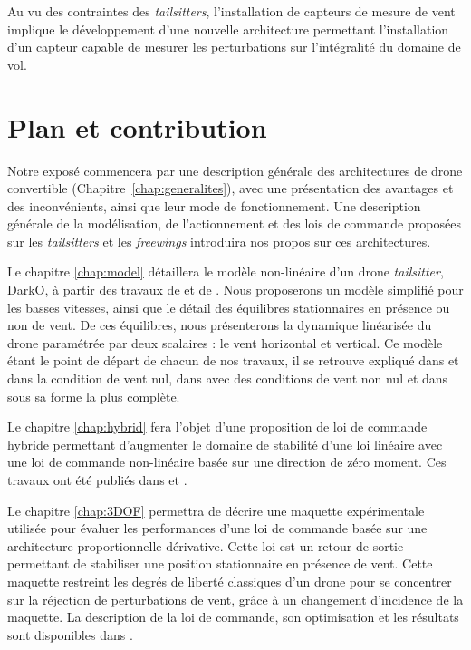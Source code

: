 Au vu des contraintes des \textit{tailsitters}, l'installation de capteurs de mesure de vent implique le développement d'une nouvelle architecture permettant l'installation d'un capteur capable de mesurer les perturbations sur l'intégralité du domaine de vol.


\section*{Plan et contribution}
Notre exposé commencera par une description générale des architectures de drone convertible (Chapitre~\ref{chap:generalites}), avec une présentation des avantages et des inconvénients, ainsi que leur mode de fonctionnement. Une description générale de la modélisation, de l'actionnement et des lois de commande proposées sur les \textit{tailsitters} et les \textit{freewings} introduira nos propos sur ces architectures.

Le chapitre \ref{chap:model} détaillera le modèle non-linéaire d'un drone \textit{tailsitter}, DarkO, à partir des travaux de \cite{lustosaHal-03035938} et de \cite{olszaneckibarthHal-02542982}. Nous proposerons un modèle simplifié pour les basses vitesses, ainsi que le détail des équilibres stationnaires en présence ou non de vent. De ces équilibres, nous présenterons la dynamique linéarisée du drone paramétrée par deux scalaires : le vent horizontal et vertical. Ce modèle étant le point de départ de chacun de nos travaux, il se retrouve expliqué dans \cite[Chapitre 2]{sansouStage} et \cite[Section II]{sansouECC} dans la condition de vent nul, dans \cite[Section 2]{SANSOUACA} avec des conditions de vent non nul et dans \cite[Section II]{sansouTCST} sous sa forme la plus complète.

Le chapitre \ref{chap:hybrid} fera l'objet d'une proposition de loi de commande hybride permettant d'augmenter le domaine de stabilité d'une loi linéaire avec une loi de commande non-linéaire basée sur une direction de zéro moment. Ces travaux ont été publiés dans  \cite{sansouStage} et \cite{sansouECC}.

Le chapitre \ref{chap:3DOF} permettra de décrire une maquette expérimentale utilisée pour évaluer les performances d'une loi de commande basée sur une architecture proportionnelle dérivative. Cette loi est un retour de sortie permettant de stabiliser une position stationnaire en présence de vent. Cette maquette restreint les degrés de liberté classiques d'un drone pour se concentrer sur la réjection de perturbations de vent, grâce à un changement d'incidence de la maquette. La description de la loi de commande, son optimisation et les résultats sont disponibles dans \cite{SANSOUACA}.

